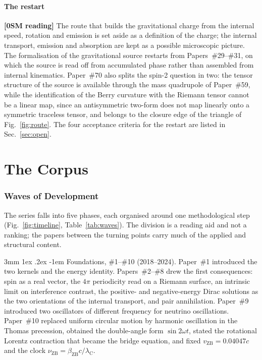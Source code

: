 \documentclass[%
 reprint, amsmath,amssymb, aps, prb, ]{revtex4-2}
\makeatletter
\numberwithin{equation}{section}
\renewcommand\paragraph{%
  \@startsection{paragraph}{4}{\z@}%
    {3mm \@plus 1ex \@minus .2ex}%
    {-1em}%
    {\normalfont\normalsize\itshape}}
\newcommand{\vZB}{v_{\text{ZB}}}
\newcommand{\betaZB}{\beta_{\text{ZB}}}
\newcommand{\lambdaC}{\lambda_{\text{C}}}
\newcommand{\nuZB}{\nu_{\text{ZB}}}
\makeatother
\begin{document}
\subsection{The restart}

\textbf{[0SM reading]} The route that builds the gravitational charge from the internal speed, rotation and emission is set aside as a definition of the charge; the internal transport, emission and absorption are kept as a possible microscopic picture. The formalisation of the gravitational source restarts from Papers~\#29--\#31, on which the source is read off from accumulated phase rather than assembled from internal kinematics. Paper~\#70 also splits the spin-2 question in two: the tensor structure of the source is available through the mass quadrupole of Paper~\#59, while the identification of the Berry curvature with the Riemann tensor cannot be a linear map, since an antisymmetric two-form does not map linearly onto a symmetric traceless tensor, and belongs to the closure edge of the triangle of Fig.~\ref{fig:route}. The four acceptance criteria for the restart are listed in Sec.~\ref{sec:open}.

\part{The Corpus}
\label{part:corpus}

\section{Waves of Development}
\label{sec:waves}

The series falls into five phases, each organised around one methodological step (Fig.~\ref{fig:timeline}, Table~\ref{tab:waves}). The division is a reading aid and not a ranking; the papers between the turning points carry much of the applied and structural content.

\paragraph{Foundations, \#1--\#10 (2018--2024).} Paper~\#1 introduced the two kernels and the energy identity. Papers~\#2--\#8 drew the first consequences: spin as a real vector, the $4\pi$ periodicity read on a Riemann surface, an intrinsic limit on interference contrast, the positive- and negative-energy Dirac solutions as the two orientations of the internal transport, and pair annihilation. Paper~\#9 introduced two oscillators of different frequency for neutrino oscillations. Paper~\#10 replaced uniform circular motion by harmonic oscillation in the Thomas precession, obtained the double-angle form $\sin2\omega t$, stated the rotational Lorentz contraction that became the bridge equation, and fixed $\vZB = 0.04047c$ and the clock $\nuZB = \betaZB c/\lambdaC$.
\end{document}
